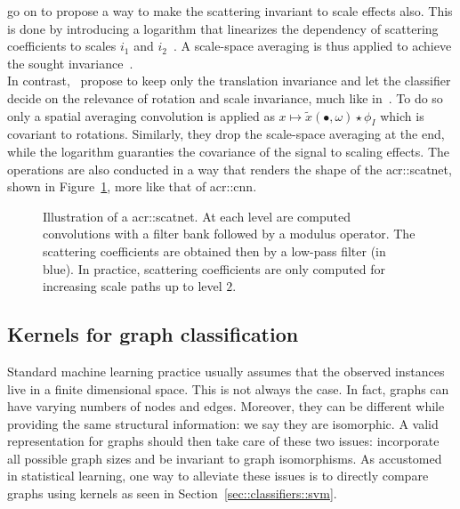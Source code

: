                \textcite{sifre2013rotation} go on to propose a way to make the scattering invariant to scale effects also.
                This is done by introducing a logarithm that linearizes the dependency of scattering coefficients to scales $i_1$ and $i_2$~\parencite{sifre2013rotation,oyallon2015deep}.
                A scale-space averaging is thus applied to achieve the sought invariance~\parencite{sifre2013rotation}.\\

                In contrast,~\textcite{oyallon2015deep} propose to keep only the translation invariance and let the classifier decide on the relevance of rotation and scale invariance, much like in~\parencite{cohen2016group}.
                To do so only a spatial averaging convolution is applied as $x \mapsto \tilde{x}(\bullet, \omega) \star \phi_I$ which is covariant to rotations.
                Similarly, they drop the scale-space averaging at the end, while the logarithm guaranties the covariance of the signal to scaling effects.
                The operations are also conducted in a way that renders the shape of the \gls{acr::scatnet}, shown in Figure~\ref{fig::scatnet}, more like that of \gls{acr::cnn}.

                \begin{figure}[htbp]
                    \centering
                    
                    \caption[
                        Illustration of a \acrshort*{acr::scatnet}.
                    ]{
                        \label{fig::scatnet} Illustration of a \gls{acr::scatnet}.
                        At each level are computed convolutions with a filter bank followed by a modulus operator.
                        The scattering coefficients are obtained then by a low-pass filter (in blue).
                        In practice, scattering coefficients are only computed for increasing scale paths up to level $2$.
                    }
                \end{figure}

    \subsection{Kernels for graph classification}
        \label{subsec::better_representation::literature::graph_classification}
        Standard machine learning practice usually assumes that the observed instances live in a finite dimensional space.
        This is not always the case.
        In fact, graphs can have varying numbers of nodes and edges.
        Moreover, they can be different while providing the same structural information: we say they are isomorphic.
        A valid representation for graphs should then take care of these two issues: incorporate all possible graph sizes and be invariant to graph isomorphisms.
        As accustomed in statistical learning, one way to alleviate these issues is to directly compare graphs using kernels as seen in Section~\ref{sec::classifiers::svm}.\\

